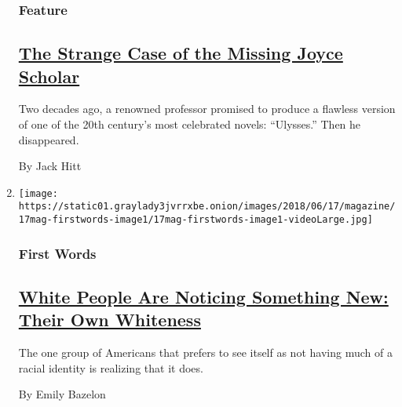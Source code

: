 \begin{enumerate}
  \hypertarget{feature-2}{%
  \subsubsection{Feature}\label{feature-2}}

  \hypertarget{the-strange-case-of-the-missing-joyce-scholar}{%
  \subsection{\texorpdfstring{\href{/2018/06/12/magazine/the-strange-case-of-the-missing-joyce-scholar.html}{The
  Strange Case of the Missing Joyce
  Scholar}}{The Strange Case of the Missing Joyce Scholar}}\label{the-strange-case-of-the-missing-joyce-scholar}}

  Two decades ago, a renowned professor promised to produce a flawless
  version of one of the 20th century's most celebrated novels:
  ``Ulysses.'' Then he disappeared.

  By Jack Hitt
\item
  \texttt{[image: https://static01.graylady3jvrrxbe.onion/images/2018/06/17/magazine/17mag-firstwords-image1/17mag-firstwords-image1-videoLarge.jpg]}

  \hypertarget{first-words}{%
  \subsubsection{First Words}\label{first-words}}

  \hypertarget{white-people-are-noticing-something-new-their-own-whiteness}{%
  \subsection{\texorpdfstring{\href{/2018/06/13/magazine/white-people-are-noticing-something-new-their-own-whiteness.html}{White
  People Are Noticing Something New: Their Own
  Whiteness}}{White People Are Noticing Something New: Their Own Whiteness}}\label{white-people-are-noticing-something-new-their-own-whiteness}}

  The one group of Americans that prefers to see itself as not having
  much of a racial identity is realizing that it does.

  By Emily Bazelon
\end{enumerate}

